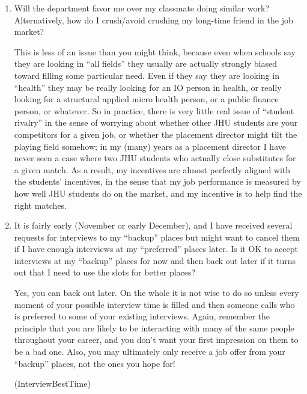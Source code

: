 \documentclass{econtex}
\providecommand\phantomsection{}
\begin{document}
\begin{enumerate}
\item Will the department favor me over my classmate doing similar work?  Alternatively, how do I crush/avoid crushing my long-time friend in the job market?

  This is less of an issue than you might think, because even when schools say they are looking in ``all fields'' they usually are actually strongly biased toward filling some particular need.  Even if they say they are looking in ``health'' they may be really looking for an IO person in health, or really looking for a structural applied micro health person, or a public finance person, or whatever.  So in practice, there is very little real issue of ``student rivalry'' in the sense of worrying about whether other JHU students are your competitors for a given job, or whether the placement director might tilt the playing field somehow; in my (many) years as a placement director I have never seen a case where two JHU students who actually close substitutes for a given match.  As a result, my incentives are almost perfectly aligned with the students' incentives, in the sense that my job performance is measured by how well JHU students do on the market, and my incentive is to help find the right matches.

\item It is fairly early (November or early December), and I have received several requests for interviews to my ``backup'' places but might want to cancel them if I have enough interviews at my ``preferred'' places later.  Is it OK to accept interviews at my ``backup'' places for now and then back out later if it turns out that I need to use the slots for better places?

  Yes, you can back out later.  On the whole it is not wise to do so unless every moment of your possible interview time is filled and then someone calls who is preferred to some of your existing interviews.  Again, remember the principle that you are likely to be interacting with many of the same people throughout your career, and you don't want your first impression on them to be a bad one.  Also, you may ultimately only receive a job offer from your ``backup'' places, not the ones you hope for!

  \ifdvi\phantomsection\hypertarget{InterviewBestTime}{(InterviewBestTime)}\fi
  

\end{enumerate}
\end{document}
